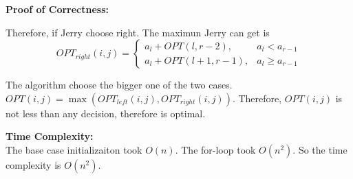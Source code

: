 \documentclass[10.5pt]{article}
\newenvironment{main idea}{\textbf{Main Idea: }}{}
\newenvironment{prcor}{\textbf{Proof of Correctness: }\\}{}
\newenvironment{complexity}{\textbf{Time Complexity: }\\}{}
\theoremstyle{remark}
\begin{document}
\begin{prcor}
\begin{enumerate}
\begin{enumerate}
		      \end{enumerate}
		      Therefore, if Jerry choose right. The maximun Jerry can get is
		      \[
			      OPT_{right}(i, j) =
			      \begin{cases}
				      a_l + OPT(l, r - 2),     & a_l < a_{r - 1}  \\
				      a_l + OPT(l + 1, r - 1), & a_l\ge a_{r - 1}
			      \end{cases}
		      \]
	\end{enumerate}
	The algorithm choose the bigger one of the two cases. \(OPT(i, j) = \max(OPT_{left}(i, j), OPT_{right}(i, j))\). Therefore, \(OPT(i, j)\) is not less than any decision, therefore is optimal.

\end{prcor}
\begin{complexity}
	The base case initializaiton took \(O(n)\). The for-loop took \(O(n^2)\). So the time complexity is \(O(n^2)\).
\end{complexity}
\pagebreak
\end{document}
